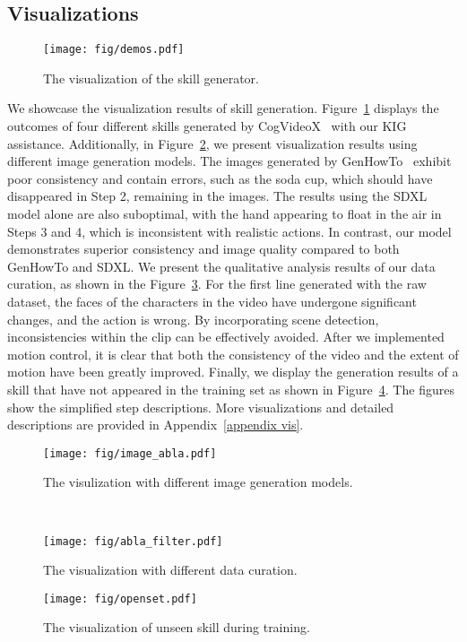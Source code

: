 \subsection{Visualizations}

\begin{figure}[t]
  \centering
   \texttt{[image: fig/demos.pdf]}
   \caption{The visualization of the skill generator.}
   \label{fig:vis}
   \vspace{-20pt}
\end{figure}


We showcase the visualization results of skill generation. Figure~\ref{fig:vis} displays the outcomes of four different skills generated by CogVideoX~\cite{cogvideox} with our KIG assistance. Additionally, in Figure~\ref{fig:ablaimage}, we present visualization results using different image generation models. The images generated by GenHowTo~\cite{genhowto} exhibit poor consistency and contain errors, such as the soda cup, which should have disappeared in Step 2, remaining in the images. The results using the SDXL~\cite{sdxl} model alone are also suboptimal, with the hand appearing to float in the air in Steps 3 and 4, which is inconsistent with realistic actions. In contrast, our model demonstrates superior consistency and image quality compared to both GenHowTo and SDXL. We present the qualitative analysis results of our data curation, as shown in the Figure~\ref{fig:abladata}. For the first line generated with the raw dataset, the faces of the characters in the video have undergone significant changes, and the action is wrong. By incorporating scene detection, inconsistencies within the clip can be effectively avoided. After we implemented motion control, it is clear that both the consistency of the video and the extent of motion have been greatly improved. Finally, we display the generation results of a skill that have not appeared in the training set as shown in Figure~\ref{fig:zeroshot}. The figures show the simplified step descriptions. More visualizations and detailed descriptions are provided in Appendix~\ref{appendix vis}.
\begin{figure}[t]
  \centering
   \texttt{[image: fig/image\_abla.pdf]}
   \caption{The visulization with different image generation models.}
   \label{fig:ablaimage}
   \vspace{-5pt}
\end{figure}  

\begin{figure}[t]
  \centering
   \texttt{[image: fig/abla\_filter.pdf]}
   \caption{The visualization with different data curation.}
   \label{fig:abladata}
   \vspace{-5pt}
\end{figure}


\begin{figure}[t]
  \centering
   \texttt{[image: fig/openset.pdf]}
   \caption{The visualization of unseen skill during training.}
   \label{fig:zeroshot}
   \vspace{-10pt}
\end{figure}
